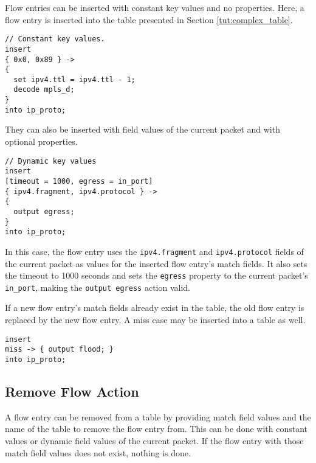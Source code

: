 Flow entries can be inserted with constant key values and no properties. Here,
a flow entry is inserted into the table presented in Section
\ref{tut:complex_table}.

\begin{codepage}
\begin{lstlisting}
// Constant key values.
insert
{ 0x0, 0x89 } ->
{
  set ipv4.ttl = ipv4.ttl - 1;
  decode mpls_d;
}
into ip_proto;
\end{lstlisting}
\end{codepage}

They can also be inserted with field values of the current packet and with
optional properties.

\begin{codepage}
\begin{lstlisting}
// Dynamic key values
insert
[timeout = 1000, egress = in_port]
{ ipv4.fragment, ipv4.protocol } ->
{
  output egress;
}
into ip_proto;
\end{lstlisting}
\end{codepage}

In this case, the flow entry uses the \texttt{ipv4.fragment} and \texttt{ipv4.protocol}
fields of the current packet as values for the inserted flow entry's match fields.
It also sets the timeout to 1000 seconds and sets the \texttt{egress} property to the
current packet's \texttt{in\_port}, making the \texttt{output egress} action
valid.

If a new flow entry's match fields already exist in the table, the old flow
entry is replaced by the new flow entry. A miss case may be inserted into a
table as well.

\begin{codepage}
\begin{lstlisting}
insert
miss -> { output flood; }
into ip_proto;
\end{lstlisting}
\end{codepage}

\subsection{Remove Flow Action} \label{tut:remove_flow_action}

A flow entry can be removed from a table by providing match field values and the
name of the table to remove the flow entry from. This can be done with constant
values or dynamic field values of the current packet. If the flow entry with
those match field values does not exist, nothing is done.

